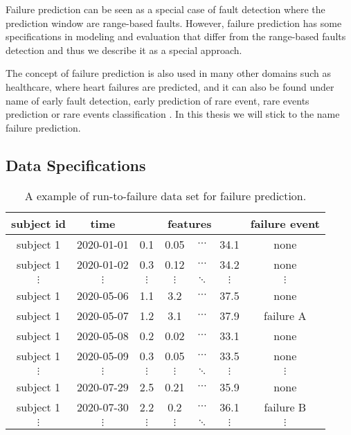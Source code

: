 Failure prediction can be seen as a special case of fault detection where the prediction window are range-based faults.
However, failure prediction has some specifications in modeling and evaluation that differ from the range-based faults detection and thus we describe it as a special approach.

The concept of failure prediction is also used in many other domains such as healthcare, where heart failures are predicted, and it can also be found under name of early fault detection, early prediction of rare event, rare events prediction or rare events classification
\cite{ng2016early,weiss1998learning,ranjan2018dataset,choi2017using}.
In this thesis we will stick to the name failure prediction.


\subsection{Data Specifications}

\begin{table}
	\centering
	\begin{tabular}{|c|c|cccc|c|}
    \hline
    subject id
    & time
    & \multicolumn{4}{|p{4cm}|}{\centering features}
    & failure event\\
    \hline
    subject 1 & 2020-01-01 &          0.1 &         0.05 & $\cdots$ &  34.1 & none \\
	subject 1 & 2020-01-02 &          0.3 &         0.12 & $\cdots$ &  34.2 & none \\
    $\vdots$ & $\vdots$ & $\vdots$ & $\vdots$ & $\ddots$ & $\vdots$ & $\vdots$ \\
    subject 1 & 2020-05-06 &          1.1 &         3.2 & $\cdots$ &  37.5 & none \\
    subject 1 & 2020-05-07 &          1.2 &         3.1 & $\cdots$ &  37.9 & failure A \\
    subject 1 & 2020-05-08 &          0.2 &         0.02 & $\cdots$ &  33.1 & none \\
    subject 1 & 2020-05-09 &          0.3 &         0.05 & $\cdots$ &  33.5 & none \\
    $\vdots$ & $\vdots$ & $\vdots$ & $\vdots$ & $\ddots$ & $\vdots$ & $\vdots$ \\
    subject 1 & 2020-07-29 &          2.5 &         0.21  & $\cdots$ &  35.9 & none \\
    subject 1 & 2020-07-30 &          2.2 &         0.2  & $\cdots$ &  36.1 & failure B \\
    $\vdots$ & $\vdots$ & $\vdots$ & $\vdots$ & $\ddots$ & $\vdots$ & $\vdots$ \\
	\end{tabular}
    \caption{A example of run-to-failure data set for failure prediction.}
    \label{tab:pdm_data_run_to_failure}
\end{table}

